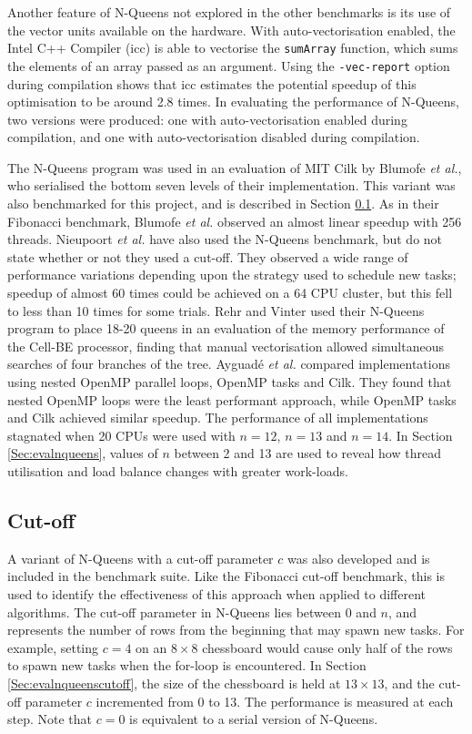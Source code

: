 \documentclass{report}
\begin{document}
Another feature of N-Queens not explored in the other benchmarks is its use of the vector units available on the hardware. With auto-vectorisation enabled, the Intel C++ Compiler (icc) is able to vectorise the \verb!sumArray! function, which sums the elements of an array passed as an argument. Using the \verb!-vec-report! option during compilation shows that icc estimates the potential speedup of this optimisation to be around 2.8 times. In evaluating the performance of N-Queens, two versions were produced: one with auto-vectorisation enabled during compilation, and one with auto-vectorisation disabled during compilation.

The N-Queens program was used in an evaluation of MIT Cilk by Blumofe \textit{et al.}\cite{Blumofe95}, who serialised the bottom seven levels of their implementation. This variant was also benchmarked for this project, and is described in Section \ref{Sec:nqueenscutoff}. As in their Fibonacci benchmark, Blumofe \textit{et al.} observed an almost linear speedup with 256 threads. Nieupoort \textit{et al.}\cite{Nieuwpoort01} have also used the N-Queens benchmark, but do not state whether or not they used a cut-off. They observed a wide range of performance variations depending upon the strategy used to schedule new tasks; speedup of almost 60 times could be achieved on a 64 CPU cluster, but this fell to less than 10 times for some trials. Rehr and Vinter \cite{Vinter08} used their N-Queens program to place 18-20 queens in an evaluation of the memory performance of the Cell-BE processor, finding that manual vectorisation allowed simultaneous searches of four branches of the tree. Ayguad\'{e} \textit{et al.}\cite{Ayguade09} compared implementations using nested OpenMP parallel loops, OpenMP tasks and Cilk. They found that nested OpenMP loops were the least performant approach, while OpenMP tasks and Cilk achieved similar speedup. The performance of all implementations stagnated when 20 CPUs were used with \(n=12\), \(n=13\) and \(n=14\). In Section \ref{Sec:evalnqueens}, values of \(n\) between 2 and 13 are used to reveal how thread utilisation and load balance changes with greater work-loads.

\subsection{Cut-off} \label{Sec:nqueenscutoff}

A variant of N-Queens with a cut-off parameter \(c\) was also developed and is included in the benchmark suite. Like the Fibonacci cut-off benchmark, this is used to identify the effectiveness of this approach when applied to different algorithms. The cut-off parameter in N-Queens lies between 0 and \(n\), and represents the number of rows from the beginning that may spawn new tasks. For example, setting \(c=4\) on an \(8 \times 8\) chessboard would cause only half of the rows to spawn new tasks when the for-loop is encountered. In Section \ref{Sec:evalnqueenscutoff}, the size of the chessboard is held at \(13 \times 13\), and the cut-off parameter \(c\) incremented from 0 to 13. The performance is measured at each step. Note that \(c=0\) is equivalent to a serial version of N-Queens.
\end{document}
